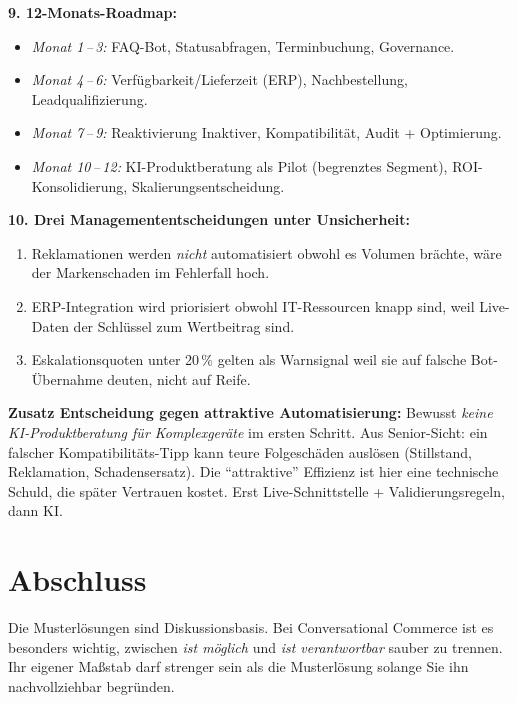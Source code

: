 \documentclass[11pt,a4paper,oneside]{article}
\begin{document}
\begin{loesungbox}
\textbf{9. 12-Monats-Roadmap:}
\begin{itemize}
  \item \emph{Monat 1\,--\,3:} FAQ-Bot, Statusabfragen, Terminbuchung, Governance.
  \item \emph{Monat 4\,--\,6:} Verfügbarkeit/Lieferzeit (ERP), Nachbestellung, Leadqualifizierung.
  \item \emph{Monat 7\,--\,9:} Reaktivierung Inaktiver, Kompatibilität, Audit + Optimierung.
  \item \emph{Monat 10\,--\,12:} KI-Produktberatung als Pilot (begrenztes Segment), ROI-Konsolidierung, Skalierungsentscheidung.
\end{itemize}

\textbf{10. Drei Managemententscheidungen unter Unsicherheit:}
\begin{enumerate}
  \item Reklamationen werden \emph{nicht} automatisiert \textendash{} obwohl es Volumen brächte, wäre der Markenschaden im Fehlerfall hoch.
  \item ERP-Integration wird priorisiert \textendash{} obwohl IT-Ressourcen knapp sind, weil Live-Daten der Schlüssel zum Wertbeitrag sind.
  \item Eskalationsquoten unter 20\,\% gelten als Warnsignal \textendash{} weil sie auf falsche Bot-Übernahme deuten, nicht auf Reife.
\end{enumerate}

\smallskip
\textbf{Zusatz \textendash{} Entscheidung gegen attraktive Automatisierung:} Bewusst \emph{keine KI-Produktberatung für Komplexgeräte} im ersten Schritt. Aus Senior-Sicht: ein falscher Kompatibilitäts-Tipp kann teure Folgeschäden auslösen (Stillstand, Reklamation, Schadensersatz). Die ``attraktive'' Effizienz ist hier eine technische Schuld, die später Vertrauen kostet. Erst Live-Schnittstelle + Validierungsregeln, dann KI.
\end{loesungbox}

\clearpage

\section*{Abschluss}
\thispagestyle{plain}

\noindent Die Musterlösungen sind Diskussionsbasis. Bei Conversational Commerce ist es besonders wichtig, zwischen \emph{ist möglich} und \emph{ist verantwortbar} sauber zu trennen. Ihr eigener Maßstab darf strenger sein als die Musterlösung \textendash{} solange Sie ihn nachvollziehbar begründen.
\end{document}
